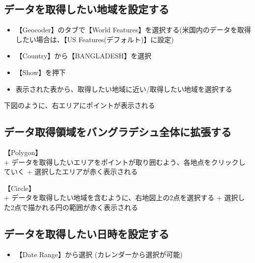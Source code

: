 \documentclass[
]{book}
\providecommand{\tightlist}{%
  \setlength{\itemsep}{0pt}\setlength{\parskip}{0pt}}
\begin{document}
\hypertarget{ux30c7ux30fcux30bfux3092ux53d6ux5f97ux3057ux305fux3044ux5730ux57dfux3092ux8a2dux5b9aux3059ux308b}{%
\subsection{データを取得したい地域を設定する}\label{ux30c7ux30fcux30bfux3092ux53d6ux5f97ux3057ux305fux3044ux5730ux57dfux3092ux8a2dux5b9aux3059ux308b}}

\begin{itemize}
\item
  【Geocoder】のタブで【World Features】を選択する(米国内のデータを取得したい場合は、【US Features(デフォルト)】に設定)
\item
  【Country】から【BANGLADESH】を選択
\item
  【Show】を押下
\item
  表示された表から、取得したい地域に近い/取得したい地域を選択する
\end{itemize}

下図のように、右エリアにポイントが表示される

\hypertarget{ux30c7ux30fcux30bfux53d6ux5f97ux9818ux57dfux3092ux30d0ux30f3ux30b0ux30e9ux30c7ux30b7ux30e5ux5168ux4f53ux306bux62e1ux5f35ux3059ux308b}{%
\subsection{データ取得領域をバングラデシュ全体に拡張する}\label{ux30c7ux30fcux30bfux53d6ux5f97ux9818ux57dfux3092ux30d0ux30f3ux30b0ux30e9ux30c7ux30b7ux30e5ux5168ux4f53ux306bux62e1ux5f35ux3059ux308b}}

【Polygon】\\
+ データを取得したいエリアをポイントが取り囲むよう、各地点をクリックしていく
+ 選択したエリアが赤く表示される

【Circle】\\
+ データを取得したい地域を含むように、右地図上の2点を選択する
+ 選択した2点で描かれる円の範囲が赤く表示される

\hypertarget{ux30c7ux30fcux30bfux3092ux53d6ux5f97ux3057ux305fux3044ux65e5ux6642ux3092ux8a2dux5b9aux3059ux308b}{%
\subsection{データを取得したい日時を設定する}\label{ux30c7ux30fcux30bfux3092ux53d6ux5f97ux3057ux305fux3044ux65e5ux6642ux3092ux8a2dux5b9aux3059ux308b}}

\begin{itemize}
\tightlist
\item
  【Date Range】から選択
  (カレンダーから選択が可能)
\end{itemize}
\end{document}
